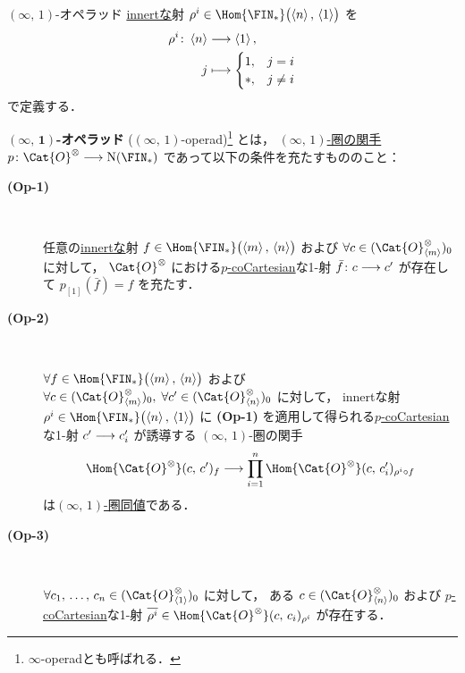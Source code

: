 \documentclass[TQFT_main]{subfiles}
\begin{document}
\begin{mydef}[label=def:infty-operad,breakable]{{$(\infty,\, 1)$}-オペラッド}
    \hyperref[def:innert-active]{innertな}射 $\rho^i \in \Hom{\FIN_*}\bigl( \expval{n},\, \expval{1} \bigr)$ を
    \begin{align}
        \rho^i \colon \expval{n} &\longrightarrow \expval{1}, \\
        j &\longmapsto \begin{cases}
            1, &j=i \\
            *, &j\neq i
        \end{cases}
    \end{align}
    で定義する．

    $\bm{(\infty,\, 1)}$\textbf{-オペラッド} ($(\infty,\, 1)$-operad)\footnote{$\infty$-operadとも呼ばれる．} とは，
    \hyperref[def:infinity-1]{$(\infty,\, 1)$-圏の関手} $p \colon \Cat{O}^{\otimes} \lto \mathrm{N}(\FIN_*)$ であって以下の条件を充たすもののこと：
    \begin{description}
        \item[\textbf{(Op-1)}]　
        
        任意の\hyperref[def:innert-active]{innertな}射 $f \in \Hom{\FIN_*} \bigl( \expval{m},\, \expval{n} \bigr)$ および $\forall c \in (\Cat{O}^\otimes_{\expval{m}})_0$ に対して，
        $\Cat{O}^\otimes$ における\hyperref[def:Cart-coCart]{$p$-coCartesian}な1-射 $\bar{f} \colon c \longrightarrow c'$ が存在して $p_{[1]}(\bar{f}) = f$ を充たす．
        
        \item[\textbf{(Op-2)}]　
        
        $\forall f \in \Hom{\FIN_*} \bigl( \expval{m},\, \expval{n} \bigr)$ および $\forall c \in (\Cat{O}^\otimes_{\expval{m}})_0,\; \forall c' \in (\Cat{O}^\otimes_{\expval{n}})_0$ に対して，
        innertな射 $\rho^i \in  \Hom{\FIN_*}\bigl( \expval{n},\, \expval{1} \bigr)$ に \textsf{\textbf{(Op-1)}} を適用して得られる\hyperref[def:Cart-coCart]{$p$-coCartesian}な1-射 $c' \longrightarrow c'_i$ が誘導する $(\infty,\, 1)$-圏の関手
        \begin{align}
            \Hom{\Cat{O}^\otimes} (c,\, c')_f \lto \prod_{i=1}^n \Hom{\Cat{O}^\otimes} (c,\, c'_i)_{\rho^i \circ f}
        \end{align}
        は\hyperref[def:equiv-infty]{$(\infty,\, 1)$-圏同値}である．

        \item[\textbf{(Op-3)}]　
        
        $\forall c_1,\, \dots,\, c_n \in (\Cat{O}^\otimes_{\expval{1}})_0$ に対して，
        ある $c \in (\Cat{O}^\otimes_{\expval{n}})_0$ および \hyperref[def:Cart-coCart]{$p$-coCartesian}な1-射 $\overline{\rho^i} \in \Hom{\Cat{O}^\otimes} (c,\, c_i)_{\rho^i}$ が存在する．
    \end{description}


\end{mydef}
\end{document}
